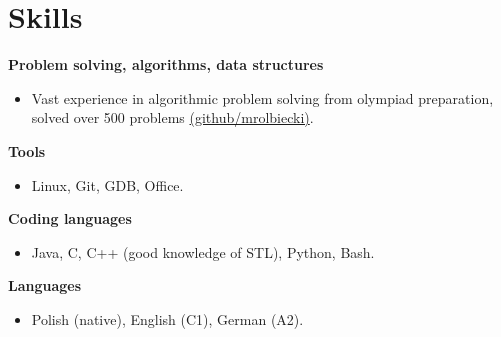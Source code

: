 \renewcommand{\subsection}[1]{
    \noindent\textbf{#1}
}
\section{Skills}
\subsection{Problem solving, algorithms, data structures}{}{}
\begin{itemize}
    \item Vast experience in algorithmic problem solving from olympiad preparation, solved over 500 problems \href{https://github.com/mrolbiecki/}{(github/mrolbiecki)}.

\end{itemize}

\subsection{Tools}{}{}
\begin{itemize}
    \item Linux, Git, GDB, Office.
\end{itemize}

\subsection{Coding languages}{}{}
\begin{itemize}
	\item Java, C, C++ (good knowledge of STL), Python, Bash.
\end{itemize}

\subsection{Languages}{}{}
\begin{itemize}
    \item Polish (native), English (C1), German (A2).
\end{itemize}
